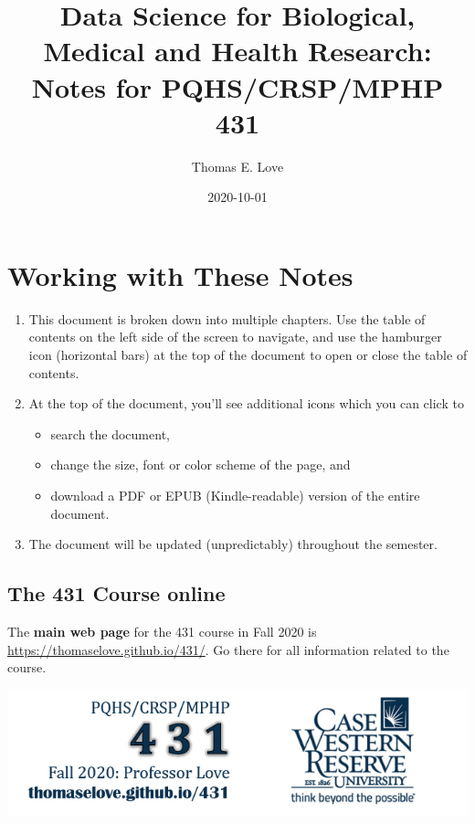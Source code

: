 \documentclass[
]{book}
\title{Data Science for Biological, Medical and Health Research: Notes for PQHS/CRSP/MPHP 431}
\author{Thomas E. Love}
\date{2020-10-01}
\providecommand{\tightlist}{%
  \setlength{\itemsep}{0pt}\setlength{\parskip}{0pt}}
\begin{document}
\maketitle

{
\setcounter{tocdepth}{1}
\tableofcontents
}
\hypertarget{working-with-these-notes}{%
\chapter*{Working with These Notes}\label{working-with-these-notes}}

\begin{enumerate}
\def\labelenumi{\arabic{enumi}.}
\tightlist
\item
  This document is broken down into multiple chapters. Use the table of contents on the left side of the screen to navigate, and use the hamburger icon (horizontal bars) at the top of the document to open or close the table of contents.
\item
  At the top of the document, you'll see additional icons which you can click to

  \begin{itemize}
  \tightlist
  \item
    search the document,
  \item
    change the size, font or color scheme of the page, and
  \item
    download a PDF or EPUB (Kindle-readable) version of the entire document.
  \end{itemize}
\item
  The document will be updated (unpredictably) throughout the semester.
\end{enumerate}

\hypertarget{the-431-course-online}{%
\section*{The 431 Course online}\label{the-431-course-online}}

The \textbf{main web page} for the 431 course in Fall 2020 is \url{https://thomaselove.github.io/431/}. Go there for all information related to the course.

\begin{center}\includegraphics[width=0.8\linewidth]{figures/431_foot2} \end{center}
\end{document}

